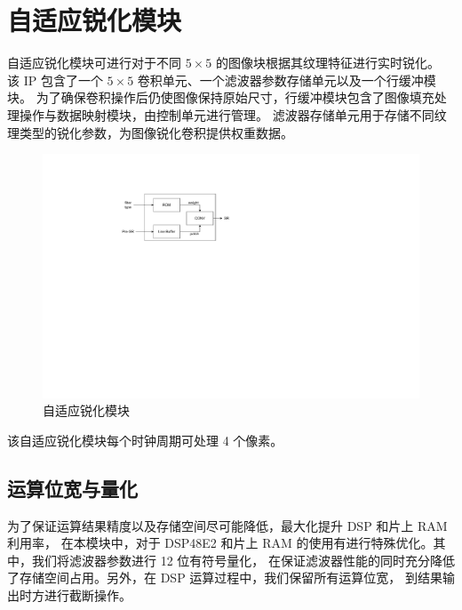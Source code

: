 \documentclass[12pt, a4paper, oneside]{ctexbook}
\begin{document}
	\section{自适应锐化模块}
	自适应锐化模块可进行对于不同 $5\times5$ 的图像块根据其纹理特征进行实时锐化。
	该 IP 包含了一个 $5\times5$ 卷积单元、一个滤波器参数存储单元以及一个行缓冲模块。
	为了确保卷积操作后仍使图像保持原始尺寸，行缓冲模块包含了图像填充处理操作与数据映射模块，由控制单元进行管理。
	滤波器存储单元用于存储不同纹理类型的锐化参数，为图像锐化卷积提供权重数据。
	\begin{figure}[h]
		\centering
		\includegraphics[scale=1]{pic/adapt.pdf}
		\caption{自适应锐化模块}
	\end{figure}	
	\par 该自适应锐化模块每个时钟周期可处理 4 个像素。
	\subsection{运算位宽与量化}
	为了保证运算结果精度以及存储空间尽可能降低，最大化提升 DSP 和片上 RAM 利用率，
	在本模块中，对于 DSP48E2 和片上 RAM 的使用有进行特殊优化。其中，我们将滤波器参数进行 12 位有符号量化，
	在保证滤波器性能的同时充分降低了存储空间占用。另外，在 DSP 运算过程中，我们保留所有运算位宽，
	到结果输出时方进行截断操作。
\end{document}

